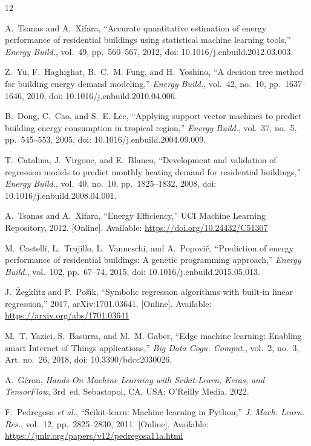 \documentclass[journal]{IEEEtran}
\begin{document}
\begin{thebibliography}{12}

A.~Tsanas and A.~Xifara, ``Accurate quantitative estimation of energy performance of residential
buildings using statistical machine learning tools,'' \emph{Energy Build.}, vol.~49, pp.~560--567,
2012, doi: 10.1016/j.enbuild.2012.03.003.

Z.~Yu, F.~Haghighat, B.~C.~M. Fung, and H.~Yoshino, ``A decision tree method for building energy
demand modeling,'' \emph{Energy Build.}, vol.~42, no.~10, pp.~1637--1646, 2010,
doi: 10.1016/j.enbuild.2010.04.006.

B.~Dong, C.~Cao, and S.~E. Lee, ``Applying support vector machines to predict building energy
consumption in tropical region,'' \emph{Energy Build.}, vol.~37, no.~5, pp.~545--553, 2005,
doi: 10.1016/j.enbuild.2004.09.009.

T.~Catalina, J.~Virgone, and E.~Blanco, ``Development and validation of regression models to predict
monthly heating demand for residential buildings,'' \emph{Energy Build.}, vol.~40, no.~10,
pp.~1825--1832, 2008, doi: 10.1016/j.enbuild.2008.04.001.

A.~Tsanas and A.~Xifara, ``Energy Efficiency,'' UCI Machine Learning Repository, 2012.
[Online]. Available: \url{https://doi.org/10.24432/C51307}

M.~Castelli, L.~Trujillo, L.~Vanneschi, and A.~Popovi\v{c}, ``Prediction of energy performance of
residential buildings: A genetic programming approach,'' \emph{Energy Build.}, vol.~102, pp.~67--74,
2015, doi: 10.1016/j.enbuild.2015.05.013.

J.~\v{Z}egklitz and P.~Po\v{s}\'{\i}k, ``Symbolic regression algorithms with built-in linear
regression,'' 2017, arXiv:1701.03641. [Online]. Available: \url{https://arxiv.org/abs/1701.03641}

M.~T. Yazici, S.~Basurra, and M.~M. Gaber, ``Edge machine learning: Enabling smart Internet of Things
applications,'' \emph{Big Data Cogn. Comput.}, vol.~2, no.~3, Art. no.~26, 2018,
doi: 10.3390/bdcc2030026.

A.~G\'{e}ron, \emph{Hands-On Machine Learning with Scikit-Learn, Keras, and TensorFlow}, 3rd~ed.
Sebastopol, CA, USA: O'Reilly Media, 2022.

F.~Pedregosa \emph{et al.}, ``Scikit-learn: Machine learning in Python,'' \emph{J. Mach. Learn. Res.},
vol.~12, pp.~2825--2830, 2011. [Online]. Available: \url{https://jmlr.org/papers/v12/pedregosa11a.html}


\end{thebibliography}
\end{document}
